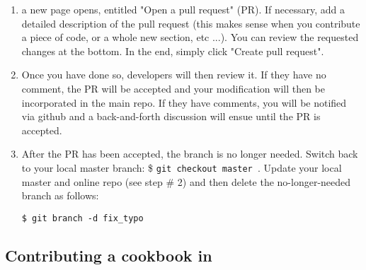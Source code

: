 \begin{enumerate}
\item a new page opens, entitled "Open a pull request" (PR). If necessary, add a detailed description of 
the pull request (this makes sense when you contribute a piece of code, or a whole new section, etc ...).
You can review the requested changes at the bottom. In the end, simply click "Create pull request".

\item Once you have done so, \aspect developers will then review it. 
If they have no comment, the PR will be accepted and your modification will 
then be incorporated in the main repo. If they have comments, you will be notified via github and a 
back-and-forth discussion will ensue until the PR is accepted. 

\item After the PR has been accepted, the branch is no longer needed. Switch back to your local master branch:
\$ \verb"git checkout master ".
Update your local master and online repo (see step \# 2) and then delete the no-longer-needed 
branch as follows:
\begin{verbatim}
$ git branch -d fix_typo
\end{verbatim}
\end{enumerate}



\newpage

\subsection{Contributing a cookbook in \aspect}

